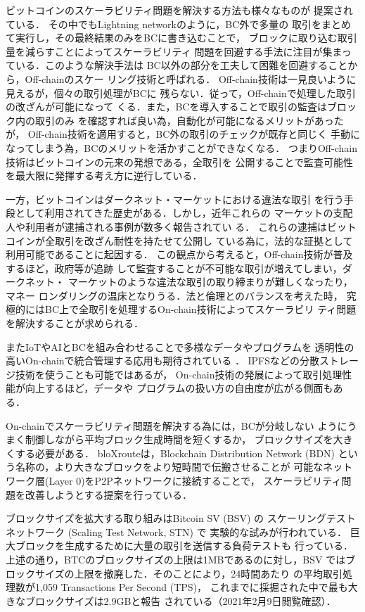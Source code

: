 \documentclass[graybox]{svmult}
\begin{document}
ビットコインのスケーラビリティ問題を解決する方法も様々なものが
提案されている\cite{ZHZB2020}．
その中でもLightning network\cite{PD2016}のように，BC外で多量の
取引をまとめて実行し，その最終結果のみをBCに書き込むことで，
ブロックに取り込む取引量を減らすことによってスケーラビリティ
問題を回避する手法に注目が集まっている．このような解決手法は
BC以外の部分を工夫して困難を回避することから，Off-chainのスケー
リング技術と呼ばれる．
Off-chain技術は一見良いように見えるが，個々の取引処理がBCに
残らない．従って，Off-chainで処理した取引の改ざんが可能になって
くる．また，BCを導入することで取引の監査はブロック内の取引のみ
を確認すれば良い為，自動化が可能になるメリットがあったが，
Off-chain技術を適用すると，BC外の取引のチェックが既存と同じく
手動になってしまう為，BCのメリットを活かすことができなくなる．
つまりOff-chain技術はビットコインの元来の発想である，全取引を
公開することで監査可能性を最大限に発揮する考え方に逆行している．

一方，ビットコインはダークネット・マーケットにおける違法な取引
を行う手段として利用されてきた歴史がある．しかし，近年これらの
マーケットの支配人や利用者が逮捕される事例が数多く報告されてい
る\cite{silkroad,alphabay,welcome2video}．
これらの逮捕はビットコインが全取引を改ざん耐性を持たせて公開し
ている為に，法的な証拠として利用可能であることに起因する．
この観点から考えると，Off-chain技術が普及するほど，政府等が追跡
して監査することが不可能な取引が増えてしまい，ダークネット・
マーケットのような違法な取引の取り締まりが難しくなったり，マネー
ロンダリングの温床となりうる．法と倫理とのバランスを考えた時，
究極的にはBC上で全取引を処理するOn-chain技術によってスケーラビリ
ティ問題を解決することが求められる．

またIoTやAIとBCを組み合わせることで多様なデータやプログラムを
透明性の高いOn-chainで統合管理する応用も期待されている
\cite{SMNA2019}．
IPFSなどの分散ストレージ技術を使うことも可能ではあるが，
On-chain技術の発展によって取引処理性能が向上するほど，データや
プログラムの扱い方の自由度が広がる側面もある．

On-chainでスケーラビリティ問題を解決する為には，BCが分岐しない
ようにうまく制御しながら平均ブロック生成時間を短くするか，
ブロックサイズを大きくする必要がある．
bloXroute\cite{bloX}は，Blockchain Distribution Network (BDN)
という名称の，より大きなブロックをより短時間で伝搬させることが
可能なネットワーク層(Layer 0)をP2Pネットワークに接続することで，
スケーラビリティ問題を改善しようとする提案を行っている．

ブロックサイズを拡大する取り組みはBitcoin SV (BSV) \cite{bsv} の
スケーリングテストネットワーク (Scaling Test Network, STN) で
実験的な試みが行われている\cite{bitcoinscaling}．
巨大ブロックを生成するために大量の取引を送信する負荷テストも
行っている．
上述の通り，BTCのブロックサイズの上限は1MBであるのに対し，BSV
ではブロックサイズの上限を撤廃した．そのことにより，24時間あたり
の平均取引処理数が1,059 Transactions Per Second (TPS)，
これまでに採掘された中で最も大きなブロックサイズは2.9GBと報告
されている（2021年2月9日閲覧確認）．
\end{document}
